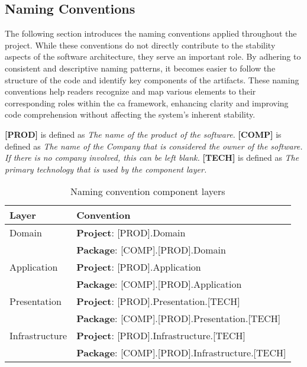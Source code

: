 \subsection{Naming Conventions} \label{naming_convention}

The following section introduces the naming conventions applied throughout the project.
While these conventions do not directly contribute to the stability aspects of the
software architecture, they serve an important role. By adhering to consistent and
descriptive naming patterns, it becomes easier to follow the structure of the code and
identify key components of the artifacts. These naming conventions help readers recognize
and map various elements to their corresponding roles within the \gls{ca} framework,
enhancing clarity and improving code comprehension without affecting the system's inherent
stability.

\textbf{[PROD]} is defined as \textit{The name of the product of the software.} \newline 
\textbf{[COMP]} is defined as \textit{The name of the Company that is considered the owner of the software. If
there is no company involved, this can be left blank.} \newline 
\textbf{[TECH]} is defined as \textit{The primary technology that is used by the component layer.} 

\begin{table}[H]
  \renewcommand{\arraystretch}{1.5}
    \footnotesize
    \caption{Naming convention component layers}
    \begin{tabular}{ l l }
    \hline
    \textbf{Layer} & \textbf{Convention} \\ 
    \hline
    Domain & \textbf{Project}: [PROD].Domain \\ & \textbf{Package}: [COMP].[PROD].Domain \\
    Application & \textbf{Project}: [PROD].Application \\ & \textbf{Package}: [COMP].[PROD].Application \\
    Presentation & \textbf{Project}: [PROD].Presentation.[TECH] \\ & \textbf{Package}: [COMP].[PROD].Presentation.[TECH] \\
    Infrastructure & \textbf{Project}: [PROD].Infrastructure.[TECH] \\ & \textbf{Package}: [COMP].[PROD].Infrastructure.[TECH]
    \\ \hline
    \end{tabular}

\label{table:component_naming_convention}
\end{table}


